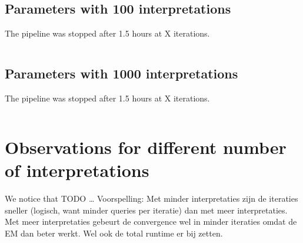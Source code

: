 \subsection{Parameters with 100 interpretations}
The pipeline was stopped after 1.5 hours at X iterations.
\begin{lstlisting}

\end{lstlisting}

\subsection{Parameters with 1000 interpretations}
The pipeline was stopped after 1.5 hours at X iterations.
\begin{lstlisting}

\end{lstlisting}


\section{Observations for different number of interpretations}
We notice that TODO \ldots
Voorspelling: Met minder interpretaties zijn de iteraties sneller (logisch, want minder queries per iteratie) dan met meer interpretaties. Met meer interpretaties gebeurt de convergence wel in minder iteraties omdat de EM dan beter werkt. Wel ook de total runtime er bij zetten.